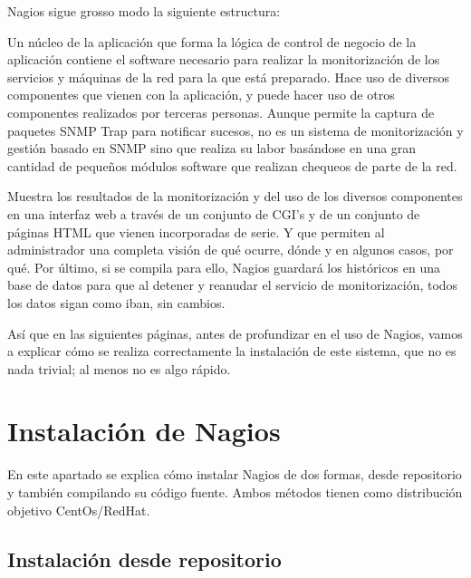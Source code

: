 \documentclass[11pt,a4paper]{article}
\begin{document}


Nagios sigue grosso modo la siguiente estructura:

Un núcleo de la aplicación que forma la lógica de control de negocio de la aplicación contiene el software necesario para realizar la monitorización de los servicios y máquinas de la red para la que está preparado. Hace uso de diversos componentes que vienen con la aplicación, y puede hacer uso de otros componentes realizados por terceras personas.
Aunque permite la captura de paquetes SNMP Trap para notificar sucesos, no es un sistema de monitorización y gestión basado en SNMP sino que realiza su labor basándose en una gran cantidad de pequeños módulos software que realizan chequeos de parte de la red.

Muestra los resultados de la monitorización y del uso de los diversos componentes en una interfaz web a través de un conjunto de CGI’s y de un conjunto de páginas HTML que vienen incorporadas de serie. Y que permiten al administrador una completa visión de qué ocurre, dónde y en algunos casos, por qué.
Por último, si se compila para ello, Nagios guardará los históricos en una base de datos para que al detener y reanudar el servicio de monitorización, todos los datos sigan como iban, sin cambios.


Así que en las siguientes páginas, antes de profundizar en el uso de Nagios, vamos a explicar cómo se realiza correctamente la instalación de este sistema, que no es nada trivial; al menos no es algo rápido.

\section{Instalación de Nagios}

En este apartado se explica cómo instalar Nagios de dos formas, desde repositorio y también compilando su código fuente. Ambos métodos tienen como distribución objetivo CentOs/RedHat.

\subsection{Instalación desde repositorio}
\end{document}
